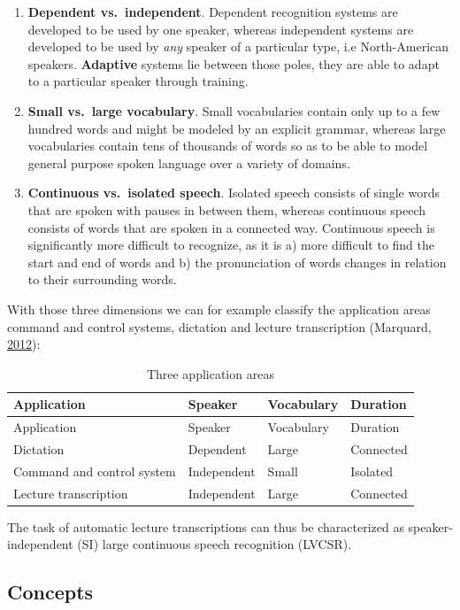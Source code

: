 \documentclass[]{article}
\begin{document}
\begin{enumerate}
\def\labelenumi{(\arabic{enumi})}
\item
  \textbf{Dependent vs.~independent}. Dependent recognition systems are
  developed to be used by one speaker, whereas independent systems are
  developed to be used by \emph{any} speaker of a particular type, i.e
  North-American speakers. \textbf{Adaptive} systems lie between those
  poles, they are able to adapt to a particular speaker through
  training.
\item
  \textbf{Small vs.~large vocabulary}. Small vocabularies contain only
  up to a few hundred words and might be modeled by an explicit grammar,
  whereas large vocabularies contain tens of thousands of words so as to
  be able to model general purpose spoken language over a variety of
  domains.
\item
  \textbf{Continuous vs.~isolated speech}. Isolated speech consists of
  single words that are spoken with pauses in between them, whereas
  continuous speech consists of words that are spoken in a connected
  way. Continuous speech is significantly more difficult to recognize,
  as it is a) more difficult to find the start and end of words and b)
  the pronunciation of words changes in relation to their surrounding
  words.
\end{enumerate}

With those three dimensions we can for example classify the application
areas command and control systems, dictation and lecture transcription
(Marquard, \hyperref[ref-marquard]{2012}):

\begin{longtable}[c]{@{}llll@{}}
\caption{Three application areas}\tabularnewline
\toprule
Application & Speaker & Vocabulary & Duration\tabularnewline
\midrule
\endfirsthead
\toprule
Application & Speaker & Vocabulary & Duration\tabularnewline
\midrule
\endhead
Dictation & Dependent & Large & Connected\tabularnewline
Command and control system & Independent & Small &
Isolated\tabularnewline
Lecture transcription & Independent & Large & Connected\tabularnewline
\bottomrule
\end{longtable}

The task of automatic lecture transcriptions can thus be characterized
as speaker-independent (SI) large continuous speech recognition (LVCSR).

\subsection{Concepts}\label{concepts}
\end{document}
